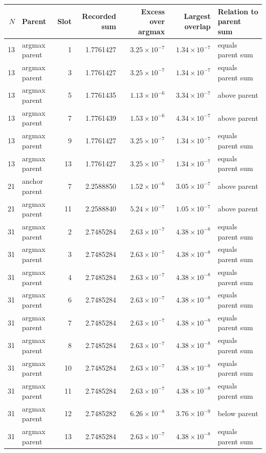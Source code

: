 \begin{center}
\scriptsize
\setlength{\tabcolsep}{4pt}
\begin{tabular}{@{}rlrrrrl@{}}
\toprule
$N$ & Parent & Slot & Recorded sum & Excess over argmax & Largest overlap & Relation to parent sum \\
\midrule
13 & argmax parent & 1 & 1.7761427 & $3.25\times10^{-7}$ & $1.34\times10^{-7}$ & equals parent sum \\
13 & argmax parent & 3 & 1.7761427 & $3.25\times10^{-7}$ & $1.34\times10^{-7}$ & equals parent sum \\
13 & argmax parent & 5 & 1.7761435 & $1.13\times10^{-6}$ & $3.34\times10^{-7}$ & above parent \\
13 & argmax parent & 7 & 1.7761439 & $1.53\times10^{-6}$ & $4.34\times10^{-7}$ & above parent \\
13 & argmax parent & 9 & 1.7761427 & $3.25\times10^{-7}$ & $1.34\times10^{-7}$ & equals parent sum \\
13 & argmax parent & 13 & 1.7761427 & $3.25\times10^{-7}$ & $1.34\times10^{-7}$ & equals parent sum \\
21 & anchor parent & 7 & 2.2588850 & $1.52\times10^{-6}$ & $3.05\times10^{-7}$ & above parent \\
21 & argmax parent & 11 & 2.2588840 & $5.24\times10^{-7}$ & $1.05\times10^{-7}$ & above parent \\
31 & argmax parent & 2 & 2.7485284 & $2.63\times10^{-7}$ & $4.38\times10^{-8}$ & equals parent sum \\
31 & argmax parent & 3 & 2.7485284 & $2.63\times10^{-7}$ & $4.38\times10^{-8}$ & equals parent sum \\
31 & argmax parent & 4 & 2.7485284 & $2.63\times10^{-7}$ & $4.38\times10^{-8}$ & equals parent sum \\
31 & argmax parent & 6 & 2.7485284 & $2.63\times10^{-7}$ & $4.38\times10^{-8}$ & equals parent sum \\
31 & argmax parent & 7 & 2.7485284 & $2.63\times10^{-7}$ & $4.38\times10^{-8}$ & equals parent sum \\
31 & argmax parent & 8 & 2.7485284 & $2.63\times10^{-7}$ & $4.38\times10^{-8}$ & equals parent sum \\
31 & argmax parent & 10 & 2.7485284 & $2.63\times10^{-7}$ & $4.38\times10^{-8}$ & equals parent sum \\
31 & argmax parent & 11 & 2.7485284 & $2.63\times10^{-7}$ & $4.38\times10^{-8}$ & equals parent sum \\
31 & argmax parent & 12 & 2.7485282 & $6.26\times10^{-8}$ & $3.76\times10^{-9}$ & below parent \\
31 & argmax parent & 13 & 2.7485284 & $2.63\times10^{-7}$ & $4.38\times10^{-8}$ & equals parent sum \\
\bottomrule
\end{tabular}
\end{center}

